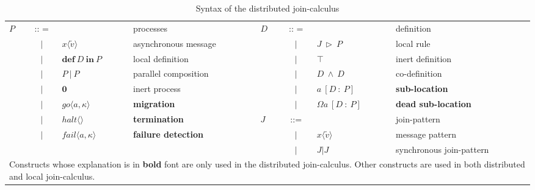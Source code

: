 \begin{table} [H]
  \begin{center}
  \begin{tabular}{ l c l  l l c l  p{\textwidth} }
$P$  & :: =  &                                               & processes                      &$D$& :: =  & & definition \\
 & $|$ & $x \langle \widetilde{v} \rangle $   & asynchronous message &&$|$&$J\ \triangleright \ P$&local rule\\
 & $|$ & $ \mathbf{def}\ D\ \mathbf{in}\ P$ & local definition                &&$|$&$\top$             & inert definition\\
 & $|$ & $P\ |\ P$                                        & parallel composition       &&$|$&$D\ \wedge \ D$&co-definition\\
 & $|$ & $\mathbf{0}$                                 & inert process                  &&$|$&$a\ [D\ :\ P]$& \bf{sub-location} \\
 & $|$ & $go\langle a, \kappa \rangle$       & \bf{migration}                  &&$|$&$\Omega a\ [D\ :\ P] $& \bf{dead sub-location} \\
 & $|$ & $halt \langle \rangle $                   & \bf{termination}               &$J$& ::= & &join-pattern\\
 & $|$ & $fail\langle a, \kappa \rangle $     & \bf{failure detection}        &&$|$& $x\langle\widetilde{v}\rangle$ & message pattern\\
 &&&&&$|$&$J|J$& synchronous join-pattern\\
   \multicolumn{8}{p{\textwidth}}{Constructs whose explanation is in {\bf{bold}} font are only used in the distributed join-calculus.  Other constructs are used in both distributed and local join-calculus.}\\
  \end{tabular}
  \end{center}
  \caption{Syntax of the distributed join-calculus}
  \label{join_syn}
\end{table}

